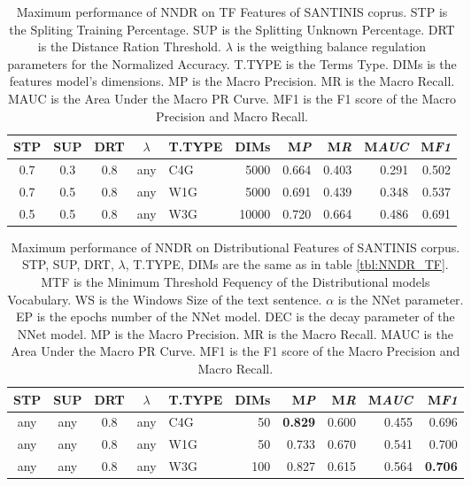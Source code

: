 {\begin{table}
\center
\begin{tabular}{cccclrrrrr}
\hline
STP & SUP & DRT & $\lambda$ & T.TYPE & DIMs & M\emph{P} & M\emph{R} & M\emph{AUC} & M\emph{F1} \\
\hline
0.7 & 0.3 & 0.8 & any & C4G & 5000 & 0.664 & 0.403 & 0.291 & 0.502 \\
0.7 & 0.5 & 0.8 & any & W1G & 5000 & 0.691 & 0.439 & 0.348 & 0.537 \\
0.5 & 0.5 & 0.8 & any & W3G & 10000 & 0.720 & 0.664 & 0.486 & 0.691 \\
\hline
\end{tabular}
\caption {Maximum performance of NNDR on TF Features of SANTINIS coprus. STP is the Spliting Training Percentage. SUP is the Splitting Unknown Percentage. DRT is the Distance Ration Threshold. $\lambda$ is the weigthing balance regulation parameters for the Normalized Accuracy. T.TYPE is the Terms Type. DIMs is the features model's dimensions. MP is the Macro Precision. MR is the Macro Recall. MAUC is the Area Under the Macro PR Curve. MF1 is the F1 score of the Macro Precision and Macro Recall.}
\label{chap:word_embeddings:tbl:NNDR_TF}
\end{table}



\begin{table}
\center
\begin{tabular}{cccclrrrrr}
\hline
STP & SUP & DRT & $\lambda$ & T.TYPE & DIMs & M\emph{P} & M\emph{R} & M\emph{AUC} & M\emph{F1} \\
\hline
any & any & 0.8 & any & C4G & 50 & \textbf{0.829} & 0.600 & 0.455 & 0.696 \\
any & any & 0.8 & any & W1G & 50 & 0.733 & 0.670 & 0.541 & 0.700 \\
any & any & 0.8 & any & W3G & 100 & 0.827 & 0.615 & 0.564 & \textbf{0.706} \\
\hline
\end{tabular}
\caption {Maximum performance of NNDR on Distributional Features of SANTINIS corpus. STP, SUP, DRT, $\lambda$, T.TYPE, DIMs are the same as in table \ref{tbl:NNDR_TF}. MTF is the Minimum Threshold Fequency of the Distributional models Vocabulary. WS is the Windows Size of the text sentence. $\alpha$ is the NNet parameter. EP is the epochs number of the NNet model. DEC is the decay parameter of the NNet model. MP is the Macro Precision. MR is the Macro Recall. MAUC is the Area Under the Macro PR Curve. MF1 is the F1 score of the Macro Precision and Macro Recall.}
\label{chap:word_embeddings:tbl:NNDR_PVBOW}
\end{table}

}
